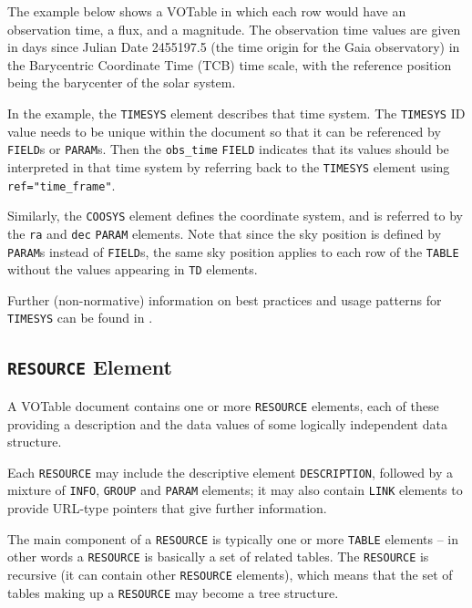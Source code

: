 \documentclass[11pt,a4paper]{ivoa}
\let\fg=\color
\def\attr#1{{\tt{\fg{DarkRed}#1}}}
\def\elem#1{{\tt{\fg{DarkRed}#1}}}
\def\attrval#1#2{{\tt{\fg{DarkRed}#1}="{\fg{DarkPurple}#2}"}}
\begin{document}
The example below shows a VOTable in which each row would have an observation
time, a flux, and a magnitude.  The observation time values are given in days since
Julian Date 2455197.5 (the time origin for the Gaia observatory) in the Barycentric
Coordinate Time (TCB) time scale, with the reference position being the barycenter
of the solar system.

In the example, the \elem{TIMESYS} element describes that time system.  The
\elem{TIMESYS} ID value needs to be unique within the document so that it can be
referenced by \elem{FIELD}s or  \elem{PARAM}s.  Then the \attr{obs\_time}
\elem{FIELD} indicates that its values should be interpreted in that time system by
referring back to the \elem{TIMESYS} element using \attrval{ref}{time\_frame}.

Similarly, the \elem{COOSYS} element defines the coordinate system, and is
referred to by the  \attr{ra}  and  \attr{dec} \elem{PARAM} elements.  Note that
since the sky position is defined by \elem{PARAM}s instead of \elem{FIELD}s,
the same sky position applies to each row of the \elem{TABLE} without the values
appearing in \elem{TD} elements.

Further (non-normative) information on best practices and usage patterns
for \elem{TIMESYS} can be found in \citet{timesys}.

\begingroup\small

\endgroup


\subsection{\elem{RESOURCE} Element}
\label{sec:resource}
\label{elem:RESOURCE}

A VOTable document contains one or more {\elem{RESOURCE}}
elements, each of these providing a description and the
data values of some logically independent data structure.


Each \elem{RESOURCE} may include the descriptive element {\elem{DESCRIPTION}},
followed by a mixture of
{\elem{INFO}}, {\elem{GROUP}} and {\elem{PARAM}} elements;
it may also contain {\elem{LINK}}
elements to provide URL-type pointers that give further information.

The main component of a \elem{RESOURCE} is typically one or more \elem{TABLE}
elements -- in other words a \elem{RESOURCE} is basically a set
of related tables. The \elem{RESOURCE} is recursive (it can contain other
\elem{RESOURCE} elements), which means that the set of tables making up
a \elem{RESOURCE} may become a tree structure.
\end{document}
